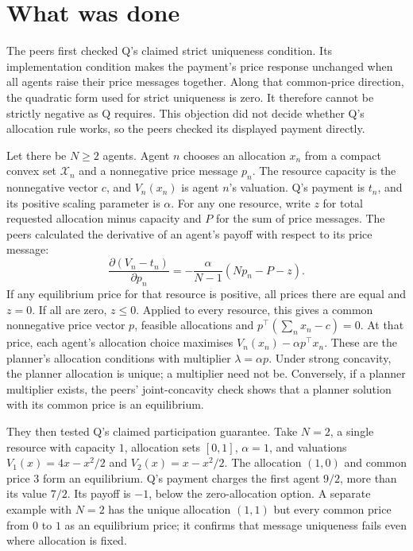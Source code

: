 \documentclass{article}
\begin{document}
\section{What was done}

The peers first checked Q's claimed strict uniqueness condition. Its implementation condition makes the payment's price
response unchanged when all agents raise their price messages together. Along that common-price direction, the
quadratic form used for strict uniqueness is zero. It therefore cannot be strictly negative as Q requires. This
objection did not decide whether Q's allocation rule works, so the peers checked its displayed payment directly.

Let there be \(N\geq 2\) agents. Agent \(n\) chooses an allocation \(x_n\) from a compact convex set \(\mathcal X_n\)
and a nonnegative price message \(p_n\). The resource capacity is the nonnegative vector \(c\), and \(V_n(x_n)\) is
agent \(n\)'s valuation. Q's payment is \(t_n\), and its positive scaling parameter is \(\alpha\). For any one
resource, write \(z\) for total requested allocation minus capacity and \(P\) for the sum of price messages. The peers
calculated the derivative of an agent's payoff with respect to its price message:
\[
\frac{\partial (V_n-t_n)}{\partial p_n}
=-\frac{\alpha}{N-1}(Np_n-P-z).
\]
If any equilibrium price for that resource is positive, all prices there are equal and \(z=0\). If all are zero,
\(z\leq 0\). Applied to every resource, this gives a common nonnegative price vector \(p\), feasible allocations and
\(p^\top(\sum_n x_n-c)=0\). At that price, each agent's allocation choice maximises \(V_n(x_n)-\alpha p^\top x_n\).
These are the planner's allocation conditions with multiplier \(\lambda=\alpha p\). Under strong concavity, the planner
allocation is unique; a multiplier need not be. Conversely, if a planner multiplier exists, the peers' joint-concavity
check shows that a planner solution with its common price is an equilibrium.

They then tested Q's claimed participation guarantee. Take \(N=2\), a single resource with capacity \(1\), allocation
sets \([0,1]\), \(\alpha=1\), and valuations \(V_1(x)=4x-x^2/2\) and \(V_2(x)=x-x^2/2\). The allocation \((1,0)\) and
common price \(3\) form an equilibrium. Q's payment charges the first agent \(9/2\), more than its value \(7/2\). Its
payoff is \(-1\), below the zero-allocation option. A separate example with \(N=2\) has the unique allocation \((1,1)\)
but every common price from \(0\) to \(1\) as an equilibrium price; it confirms that message uniqueness fails even
where allocation is fixed.
\end{document}
